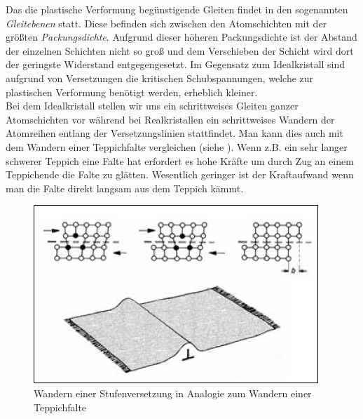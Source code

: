 \documentclass[12pt,a4paper,parskip,twoside,BCOR5mm,headsepline]{scrartcl}
\begin{document}
\begin{description*}
{Das die plastische Verformung begünstigende Gleiten findet in den sogenannten \emph{Gleitebenen} statt. Diese befinden sich zwischen den Atomschichten mit der größten \emph{Packungsdichte}. Aufgrund dieser höheren Packungsdichte ist der Abstand der einzelnen Schichten nicht so groß und dem Verschieben der Schicht wird dort der  geringste Widerstand entgegengesetzt. Im Gegensatz zum Idealkristall sind aufgrund von Versetzungen die kritischen Schubspannungen, welche zur plastischen Verformung benötigt werden,  erheblich kleiner.\\ Bei dem Idealkristall stellen wir uns ein schrittweises Gleiten ganzer Atomschichten vor während bei Realkristallen ein schrittweises Wandern der Atomreihen entlang der Versetzungslinien stattfindet. Man kann dies auch mit dem Wandern einer Teppichfalte vergleichen (siehe ). Wenn z.B. ein sehr langer schwerer Teppich eine Falte hat erfordert es hohe Kräfte um durch Zug an einem Teppichende die Falte zu glätten. Wesentlich geringer ist der Kraftaufwand wenn man die Falte direkt langsam aus dem Teppich kämmt.\autocite[45-53]{wk}
\begin{figure}
\centering
\includegraphics[width=.8\textwidth]{wandernstufenversetzung}
\caption[Wandern einer Stufenversetzung]{Wandern einer Stufenversetzung in Analogie zum Wandern einer Teppichfalte\autocite[53]{wk}}
\label{fig:wandernstufenversetzung}
\end{figure}


}
\end{description*}
\end{document}
